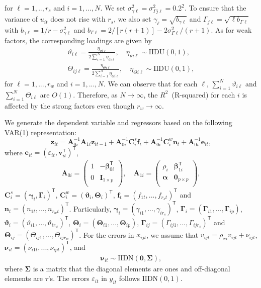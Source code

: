 \documentclass[11pt,a4paper]{article}
\newcommand{\veps}{\varepsilon}
\newcommand{\Balpha}{\boldsymbol{\alpha}}
\newcommand{\Bbeta}{\boldsymbol{\beta}}
\newcommand{\Bgamma}{\boldsymbol{\gamma}}
\newcommand{\Bvartheta}{\boldsymbol{\vartheta}}
\newcommand{\Bnu}{\boldsymbol{\nu}}
\newcommand{\BGamma}{\boldsymbol{\Gamma}}
\newcommand{\BTheta}{\boldsymbol{\Theta}}
\newcommand{\BSigma}{\boldsymbol{\Sigma}}
\newcommand{\MBzero}{\mathbf{0}}
\newcommand{\MBA}{\mathbf{A}}
\newcommand{\MBC}{\mathbf{C}}
\newcommand{\MBe}{\mathbf{e}}
\newcommand{\MBf}{\mathbf{f}}
\newcommand{\MBI}{\mathbf{I}}
\newcommand{\MBn}{\mathbf{n}}
\newcommand{\MBv}{\mathbf{v}}
\newcommand{\MBz}{\mathbf{z}}
\newcommand{\tp}{\mathsf{T}}
\theoremstyle{definition}
\begin{document}
for $\ell=1,.., r_s$ and $i=1,\ldots,N$. We set $\sigma^{2}_{\gamma\ell}=\sigma^{2}_{\Gamma j\ell}=0.2^2$. To ensure that the variance of $u_{it}$ does not rise with $r_{s}$, we also set
$\gamma_{\ell}=\sqrt{b_{\gamma\ell}}$  and
$\Gamma_{j\ell}=\sqrt{\ell b_{\Gamma \ell}}$ with
$b_{\gamma\ell}=1/r - \sigma^{2}_{\gamma\ell}$ and
$b_{\Gamma\ell}=2/[r(r+1)]-2\sigma^{2}_{\Gamma  \ell}/(r+1)$. As for weak factors, the corresponding loadings are given by
\begin{align*}
\vartheta_{i\ell}=\frac{\eta_{\vartheta i\ell}}{2\sum_{i=1}^N\eta_{\vartheta i\ell}},\quad \eta_{\vartheta i\ell}\sim\mathrm{IIDU}(0,1), \\
\Theta_{ij\ell}=\frac{\eta_{\Theta i\ell}}{2\sum_{i=1}^N\eta_{\Theta i\ell}},\quad \eta_{\Theta i\ell}\sim\mathrm{IIDU}(0,1),
\end{align*}
for $\ell =1,...,r_{w}$ and $i=1,...,N$. We can observe that for each $\ell$, $\sum_{i=1}^N\vartheta_{i\ell}$ and $\sum_{i=1}^N\Theta_{i\ell}$ are $O(1)$. Therefore, as $N\rightarrow\infty$, the $R^2$~(R-squared) for each $i$ is affected by the strong factors even though $r_{w}\rightarrow\infty$.

We generate the dependent variable and regressors based on the following VAR(1) representation:
\[
\MBz_{it} =\MBA_{0i}^{-1}\MBA_{1i}\MBz_{it-1} +  \MBA_{0i}^{-1}\MBC_{i}^{s}\MBf_{t}+ \MBA_{0i}^{-1}\MBC_{i}^{w}\MBn_{t}+ \MBA_{0i}^{-1}\MBe_{it},
\]
where $\MBe_{it}=(\veps_{it}, \MBv_{it}^{\tp})^{\tp}$,
\begin{align*}
\MBA_{0i}= \left(\begin{array}{cc}
         1 & -\Bbeta_{0i}^{\tp} \\
                     0 & \MBI_{1\times p}  \\
                   \end{array}
                 \right),\quad \MBA_{1i}=\left(
        \begin{array}{cc}
          \rho_{i} & \Bbeta_{1i}^{\tp} \\
          \Balpha & \MBzero_{p\times p} \\
        \end{array}
      \right),
\end{align*}
$\MBC_{i}^{s}=(\Bgamma_{i},\BGamma_{i})^{\tp}$, $\MBC_{i}^{w}=(\Bvartheta_{i},\BTheta_{i})^{\tp}$, $\MBf_t=(f_{1 t},...,f_{r_s t})^{\tp}$  and $\MBn_t=(n_{1 t},...,n_{r_w t})^{\tp}$. Particularly, $\Bgamma_{i}=(\gamma_{i1},...,\gamma_{ir_s})^{\tp}$, $\BGamma_{i}=(\BGamma_{i1},...,\BGamma_{ip})$, $\Bvartheta_{i}=(\vartheta_{i1},...,\vartheta_{ir_w})^{\tp}$, $\BTheta_{i}=(\BTheta_{i1},...,\BTheta_{ip})$, $\BGamma_{ij}=(\Gamma_{ij1},...,\Gamma_{ijr_{s}})^{\tp}$ and $\BTheta_{ij}=(\Theta_{ij1},...,\Theta_{ijr_{w}})^{\tp}$.  For the errors in $x_{ijt}$, we assume that  $v_{ijt} =\rho_{xi}v_{ijt} +\nu_{ijt}$, $\Bnu_{it}=(\nu_{i1t},...,\nu_{ipt})^{\tp}$, and
\begin{align*}
\Bnu_{it}\sim \mathrm{IIDN} \left(\MBzero, \BSigma\right),
\end{align*}
where $\BSigma$ is a matrix that the diagonal elements are ones and off-diagonal elements are $\tau$'s. The errors $\veps_{it}$ in $y_{it}$ follows $\mathrm{IIDN} (0, 1)$.
\end{document}
